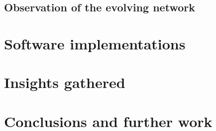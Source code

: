 \documentclass[runningheads]{llncs}
\begin{document}
\subsection{Observation of the evolving network}

\section{Software implementations}\label{sec:imp}
\section{Insights gathered}\label{sec:ins}
\section{Conclusions and further work}\label{sec:con}
%
%
%


%
% 
% 
% 
% 
\end{document}
